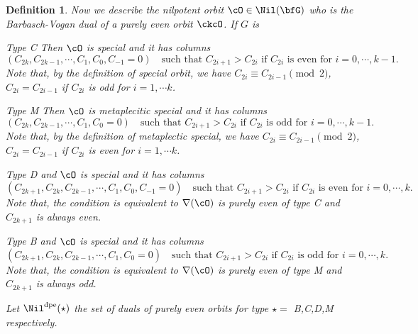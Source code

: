 \documentclass[12pt,a4paper]{amsart}
\def\DD{\nabla}
\numberwithin{equation}{section}
\newtheorem{defn}[thm]{Definition}
\theoremstyle{remark}
\def\dpeNil{\Nil^{\mathrm{dpe}}}
\newcommand{\ess}{essential }
\begin{document}

\begin{defn} \label{def:noticed}
  Now we describe the nilpotent orbit $\cO\in \Nil(\bfG)$ who is the
  Barbasch-Vogan dual of a purely even orbit $\ckcO$. If $G$ is
  \begin{des}
    \item [Type C] Then
          $\cO$ is special and it has columns
          \[
            ( C_{2k},C_{2k-1},\cdots, C_{1},C_{0}, C_{-1}=0 )
            \quad \text{such that } C_{2i+1}>C_{2i} \text{ if } C_{2i} \text{ is even for
            } i=0, \cdots, k-1.
          \]
           Note that, by the
          definition of special orbit,
          we have $C_{2i}\equiv C_{2i-1} \pmod{2}$, $C_{2i} = C_{2i-1}$ if
          $C_{2i}$ is odd for $i = 1, \cdots k$.
    \item [Type M] Then
          $\cO$ is metaplecitic special and it has columns
          \[
            ( C_{2k},C_{2k-1},\cdots, C_{1},C_{0}=0 )
            \quad \text{such that } C_{2i+1}>C_{2i} \text{ if } C_{2i} \text{ is odd for } i=0, \cdots, k-1.
          \]
          Note that, by the
          definition of metaplectic special,
          we have $C_{2i}\equiv C_{2i-1} \pmod{2}$, $C_{2i} = C_{2i-1}$ if
          $C_{2i}$ is even
          for $i = 1, \cdots k$.
    \item [Type D] and $\cO$ is special and it has columns
          \[
            ( C_{2k+1},C_{2k},C_{2k-1},\cdots, C_{1},C_{0}, C_{-1}=0 )
            \quad \text{such that } C_{2i+1}>C_{2i} \text{ if } C_{2i} \text{ is
              even for } i=0, \cdots, k.
          \]
          Note that, the
          condition is equivalent to $\DD(\cO)$ is purely even of type C and
          $C_{2k+1}$ is always even.
    \item [Type B] and $\cO$ is special and it has columns
          \[
            ( C_{2k+1},C_{2k},C_{2k-1},\cdots, C_{1},C_{0} =0 )
            \quad \text{such that } C_{2i+1}>C_{2i} \text{ if } C_{2i} \text{ is
              odd for } i=0, \cdots, k.
          \]
          Note that, the condition is equivalent to $\DD(\cO)$ is purely even of type M and
          $C_{2k+1}$ is always odd.
  \end{des}
  Let $\dpeNil(\star)$ the set of duals of purely even
  orbits for type $\star=$ B,C,D,M respectively.

\end{defn}
\end{document}
